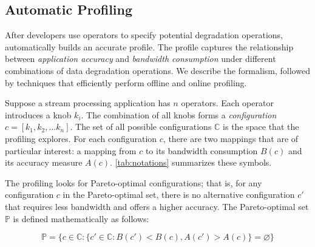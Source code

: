 \subsection{Automatic Profiling}
\label{sec:automatic-profiling}

After developers use \maybe{} operators to specify potential degradation
operations, \sysname{} automatically builds an accurate profile. The profile
captures the relationship between \textit{application accuracy} and
\textit{bandwidth consumption} under different combinations of data degradation
operations. We describe the formalism, followed by techniques that efficiently
perform offline and online profiling.

 Suppose a stream processing application has $n$
\maybe{} operators. Each operator introduces a knob $k_i$. The combination of
all knobs forms a \textit{configuration} $c = [k_{1}, k_{2}, ... k_{n}]$. The
set of all possible configurations $\mathbb{C}$ is the space that the profiling
explores. For each configuration $c$, there are two mappings that are of
particular interest: a mapping from $c$ to its bandwidth consumption $B(c)$ and
its accuracy measure $A(c)$. \autoref{tab:notations} summarizes these symbols.

The profiling looks for Pareto-optimal configurations; that is, for any
configuration $c$ in the Pareto-optimal set, there is no alternative
configuration $c'$ that requires less bandwidth and offers a higher
accuracy. The Pareto-optimal set $\mathbb{P}$ is defined mathematically as
follows:

{\small \vspace{-1em}
  \begin{equation}
  \mathbb{P} = \{ c \in \mathbb{C} : \{ c' \in \mathbb{C}: B(c') < B(c),
  A(c') > A(c) \} = \varnothing\}
  \label{eq:pareto}
\end{equation}
}%

